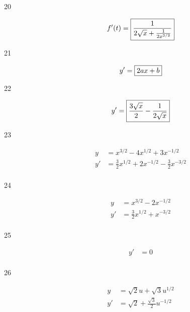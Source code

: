 \documentclass[letterpaper]{exam}
\begin{document}
\begin{description}




    \item[20] 
      \[
        f'(t) = \boxed{ \frac{1}{2 \sqrt{x} + \frac{1}{2 x^{3/2}} } } \\
      \]

    \item[21] 
      \[
        y' = \boxed{ 2ax + b } \\
      \]

    \item[22] 
      \[
        y' = \boxed{ \frac{3 \sqrt{x}}{2}-\frac{1}{2 \sqrt{x}} } \\
      \]

    \item[23] 
      \begin{align*}
        y  & = x^{3/2} - 4x^{1/2} + 3x^{-1/2} \\
        y' & = \boxed{ \frac{3}{2}x^{1/2} + 2x^{-1/2} - \frac{3}{2} x^{-3/2} } \\
      \end{align*}

    \item[24] 
      \begin{align*}
        y  & = x^{3/2} - 2x^{-1/2} \\
        y' & = \boxed{ \frac{3}{2}x^{1/2} + x^{-3/2} } \\
      \end{align*}

    \item[25] 
      \begin{align*}
        y' & = \boxed{ 0 } \\
      \end{align*}

    \item[26] 
      \begin{align*}
        y  & = \sqrt{2} u + \sqrt{3} u^{1/2} \\
        y' & = \boxed{\sqrt{2} + \frac{\sqrt{3}}{2} u^{-1/2}} \\
      \end{align*}


\end{description}
\end{document}
